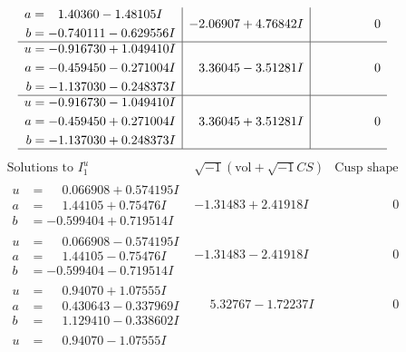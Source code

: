 \documentclass[1p]{elsarticle_modified}
\theoremstyle{definition}
\newcommand{\I}{\sqrt{-1}}
\begin{document}
$$\begin{array}{c|c|c}
\begin{aligned}
a &= \phantom{-}1.40360 - 1.48105 I \\
b &= -0.740111 - 0.629556 I\end{aligned}
 & -2.06907 + 4.76842 I & \phantom{-0.000000 } 0 \\ \hline\begin{aligned}
u &= -0.916730 + 1.049410 I \\
a &= -0.459450 - 0.271004 I \\
b &= -1.137030 - 0.248373 I\end{aligned}
 & \phantom{-}3.36045 - 3.51281 I & \phantom{-0.000000 } 0 \\ \hline\begin{aligned}
u &= -0.916730 - 1.049410 I \\
a &= -0.459450 + 0.271004 I \\
b &= -1.137030 + 0.248373 I\end{aligned}
 & \phantom{-}3.36045 + 3.51281 I & \phantom{-0.000000 } 0\\
 \hline 
 \end{array}$$\newpage$$\begin{array}{c|c|c}  
\text{Solutions to }I^u_{1}& \I (\text{vol} + \sqrt{-1}CS) & \text{Cusp shape}\\
 \hline 
\begin{aligned}
u &= \phantom{-}0.066908 + 0.574195 I \\
a &= \phantom{-}1.44105 + 0.75476 I \\
b &= -0.599404 + 0.719514 I\end{aligned}
 & -1.31483 + 2.41918 I & \phantom{-0.000000 } 0 \\ \hline\begin{aligned}
u &= \phantom{-}0.066908 - 0.574195 I \\
a &= \phantom{-}1.44105 - 0.75476 I \\
b &= -0.599404 - 0.719514 I\end{aligned}
 & -1.31483 - 2.41918 I & \phantom{-0.000000 } 0 \\ \hline\begin{aligned}
u &= \phantom{-}0.94070 + 1.07555 I \\
a &= \phantom{-}0.430643 - 0.337969 I \\
b &= \phantom{-}1.129410 - 0.338602 I\end{aligned}
 & \phantom{-}5.32767 - 1.72237 I & \phantom{-0.000000 } 0 \\ \hline\begin{aligned}
u &= \phantom{-}0.94070 - 1.07555 I \\

\end{aligned}
\end{array}$$
\end{document}
